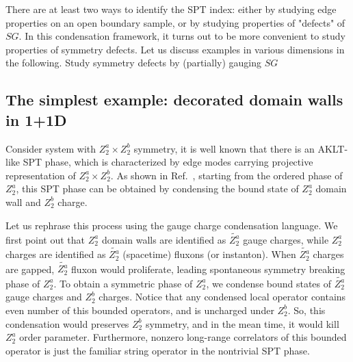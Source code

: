 \documentclass[reprint,amsmath,amssymb,aps,pra,]{revtex4-1}
\begin{document}
There are at least two ways to identify the SPT index: either by studying edge properties on an open boundary sample, or by studying properties of "defects" of $SG$.
In this condensation framework, it turns out to be more convenient to study properties of symmetry defects.
Let us discuss examples in various dimensions in the following.
{\color{red} Study symmetry defects by (partially) gauging $SG$}

\subsection{The simplest example: decorated domain walls in 1+1D}\label{subapp:decorated_dw}
Consider system with $Z_2^a\times Z_2^b$ symmetry, it is well known that there is an AKLT-like SPT phase, which is characterized by edge modes carrying projective representation of $Z_2^a\times Z_2^b$.
As shown in Ref.~, starting from the ordered phase of $Z_2^a$, this SPT phase can be obtained by condensing the bound state of $Z_2^a$ domain wall and $Z_2^b$ charge.

Let us rephrase this process using the gauge charge condensation language.
We first point out that $Z_2^a$ domain walls are identified as $\widetilde{Z_2^a}$ gauge charges, while $Z_2^a$ charges are identified as $\widetilde{Z_2^a}$ (spacetime) fluxons (or instanton).
When $\widetilde{Z_2^a}$ charges are gapped, $\widetilde{Z_2^a}$ fluxon would proliferate, leading spontaneous symmetry breaking phase of $Z_2^a$.
To obtain a symmetric phase of $Z_2^a$, we condense bound states of $\widetilde{Z_2^a}$ gauge charges and $Z_2^b$ charges. 
Notice that any condensed local operator contains even number of this bounded operators, and is uncharged under $Z_2^b$.
So, this condensation would preserves $Z_2^b$ symmetry, and in the mean time, it would kill $Z_2^a$ order parameter.
Furthermore, nonzero long-range correlators of this bounded operator is just the familiar string operator in the nontrivial SPT phase\cite{PollmannTurner2012}.

\end{document}
